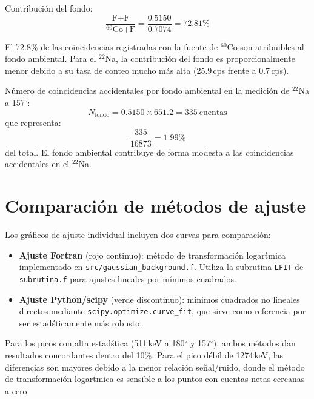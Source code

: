 \documentclass[12pt,a4paper]{article}
\begin{document}
Contribuci\'on del fondo:
\begin{equation}
\frac{\text{F+F}}{\text{$^{60}$Co+F}} = \frac{0.5150}{0.7074} = 72.81\%
\end{equation}

El 72.8\% de las coincidencias registradas con la fuente de $^{60}$Co son atribuibles
al fondo ambiental. Para el $^{22}$Na, la contribuci\'on del fondo es proporcionalmente
menor debido a su tasa de conteo mucho m\'as alta (25.9\,cps frente a 0.7\,cps).

N\'umero de coincidencias accidentales por fondo ambiental en la medici\'on de $^{22}$Na a 157$^\circ$:
\begin{equation}
N_{\text{fondo}} = 0.5150 \times 651.2 = 335\ \text{cuentas}
\end{equation}
que representa:
\begin{equation}
\frac{335}{16873} = 1.99\%
\end{equation}
del total. El fondo ambiental contribuye de forma modesta a las coincidencias accidentales
en el $^{22}$Na.

\section{Comparaci\'on de m\'etodos de ajuste}

Los gr\'aficos de ajuste individual incluyen dos curvas para comparaci\'on:
\begin{itemize}
  \item \textbf{Ajuste Fortran} (rojo continuo): m\'etodo de transformaci\'on logar\'tmica
        implementado en \texttt{src/gaussian\_background.f}. Utiliza la subrutina \texttt{LFIT}
        de \texttt{subrutina.f} para ajustes lineales por m\'inimos cuadrados.
  \item \textbf{Ajuste Python/scipy} (verde discontinuo): m\'inimos cuadrados no lineales
        directos mediante \texttt{scipy.optimize.curve\_fit}, que sirve como referencia
        por ser estad\'sticamente m\'as robusto.
\end{itemize}

Para los picos con alta estad\'stica (511\,keV a 180$^\circ$ y 157$^\circ$), ambos m\'etodos
dan resultados concordantes dentro del 10\%. Para el pico d\'ebil de 1274\,keV, las diferencias
son mayores debido a la menor relaci\'on se\~nal/ruido, donde el m\'etodo de transformaci\'on
logar\'tmica es sensible a los puntos con cuentas netas cercanas a cero.
\end{document}
